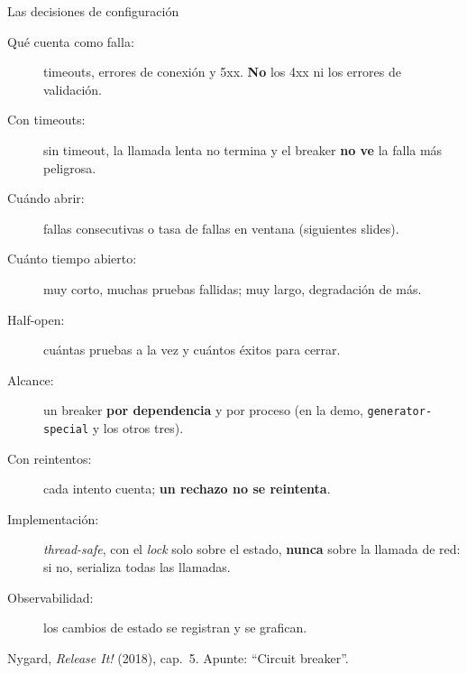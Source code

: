 \documentclass[institutional,screen,none]{ua-engineering-v6-beamer}
\begin{document}
\begin{frame}{Las decisiones de configuración}
\small
\begin{description}
\item[Qué cuenta como falla:] timeouts, errores de conexión y 5xx. \textbf{No} los 4xx ni los errores de validación.
\item[Con timeouts:] sin timeout, la llamada lenta no termina y el breaker \textbf{no ve} la falla más peligrosa.
\item[Cuándo abrir:] fallas consecutivas o tasa de fallas en ventana (siguientes slides).
\item[Cuánto tiempo abierto:] muy corto, muchas pruebas fallidas; muy largo, degradación de más.
\item[Half-open:] cuántas pruebas a la vez y cuántos éxitos para cerrar.
\item[Alcance:] un breaker \textbf{por dependencia} y por proceso (en la demo, \texttt{generator-special} y los otros tres).
\item[Con reintentos:] cada intento cuenta; \textbf{un rechazo no se reintenta}.
\item[Implementación:] \emph{thread-safe}, con el \emph{lock} solo sobre el estado, \textbf{nunca} sobre la llamada de red: si no, serializa todas las llamadas.
\item[Observabilidad:] los cambios de estado se registran y se grafican.
\end{description}

{\scriptsize\color{UAIngMuted}Nygard, \emph{Release It!} (2018), cap.~5. Apunte: ``Circuit breaker''.}
\end{frame}
\end{document}
